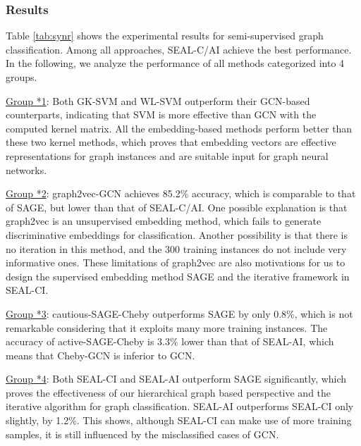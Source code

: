 \documentclass[sigconf]{acmart}
\begin{document}
\subsubsection{Results}
Table \ref{tab:synr} shows the experimental results for semi-supervised graph classification.  Among all approaches, SEAL-C/AI achieve the best performance.  In the following, we analyze the performance of all methods categorized into 4 groups.

\noindent\underline{Group *1}: Both GK-SVM and WL-SVM outperform their GCN-based counterparts, indicating that SVM is more effective than GCN with the computed kernel matrix.  All the embedding-based methods perform better than these two kernel methods, which proves that embedding vectors are effective representations for graph instances and are suitable input for graph neural networks.

\noindent\underline{Group *2}: graph2vec-GCN achieves 85.2\% accuracy, which is comparable to that of SAGE, but lower than that of SEAL-C/AI.  One possible explanation is that graph2vec is an unsupervised embedding method, which fails to generate discriminative embeddings for classification.  Another possibility is that there is no iteration in this method, and the 300 training instances do not include very informative ones. These limitations of graph2vec are also motivations for us to design the supervised embedding method SAGE and the iterative framework in SEAL-CI.

\noindent\underline{Group *3}: cautious-SAGE-Cheby outperforms SAGE by only 0.8\%, which is not remarkable considering that it exploits many more training instances.  The accuracy of active-SAGE-Cheby is 3.3\% lower than that of SEAL-AI, which means that Cheby-GCN is inferior to GCN.

\noindent\underline{Group *4}: Both SEAL-CI and SEAL-AI outperform SAGE significantly, which proves the effectiveness of our hierarchical graph based perspective and the iterative algorithm for graph classification.  SEAL-AI outperforms SEAL-CI only slightly, by 1.2\%.  This shows, although SEAL-CI can make use of more training samples, it is still influenced by the misclassified cases of GCN.
\end{document}
